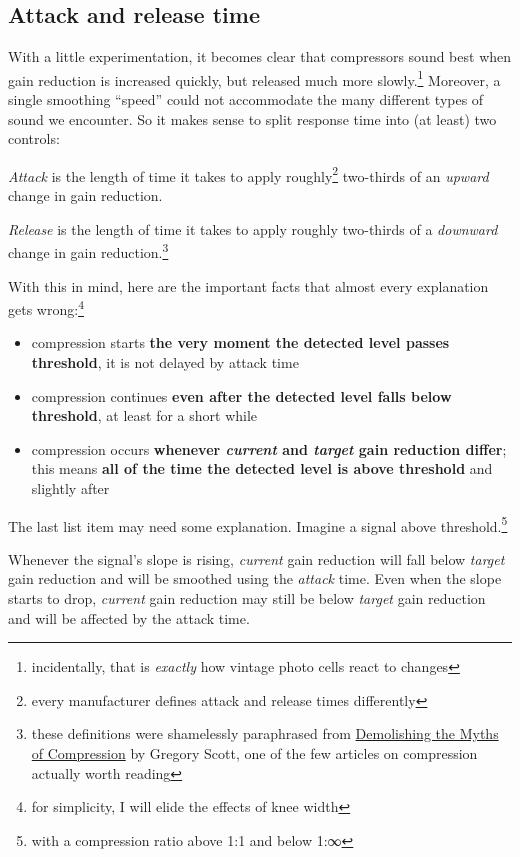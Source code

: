 \subsection{Attack and release time}
\label{sec:attack_and_release_time}

With a little experimentation, it becomes clear that compressors sound
best when gain reduction is increased quickly, but released much more
slowly.\footnote{incidentally, that is \emph{exactly} how vintage
  photo cells react to changes} Moreover, a single smoothing ``speed''
could not accommodate the many different types of sound we encounter.
So it makes sense to split response time into (at least) two controls:

\emph{Attack} is the length of time it takes to apply
roughly\footnote{every manufacturer defines attack and release times
  differently} two-thirds of an \emph{upward} change in gain
reduction.

\emph{Release} is the length of time it takes to apply roughly
two-thirds of a \emph{downward} change in gain
reduction.\footnote{these definitions were shamelessly paraphrased
  from
  \href{https://www.attackmagazine.com/features/columns/gregory-scott-demolishing-the-myths-of-compression/}{Demolishing
    the Myths of Compression} by Gregory Scott, one of the few
  articles on compression actually worth reading}

With this in mind, here are the important facts that almost every
explanation gets wrong:\footnote{for simplicity, I will elide the
  effects of knee width}

\begin{itemize}
\item compression starts \textbf{the very moment the detected level
    passes threshold}, it is not delayed by attack time
\item compression continues \textbf{even after the detected level
    falls below threshold}, at least for a short while
\item compression occurs \textbf{whenever \emph{current} and
    \emph{target} gain reduction differ}; this means \textbf{all of
    the time the detected level is above threshold} and slightly after
\end{itemize}

The last list item may need some explanation.  Imagine a signal above
threshold.\footnote{with a compression ratio above 1:1 and below 1:∞}

Whenever the signal's slope is rising, \emph{current} gain reduction
will fall below \emph{target} gain reduction and will be smoothed
using the \emph{attack} time.  Even when the slope starts to drop,
\emph{current} gain reduction may still be below \emph{target} gain
reduction and will be affected by the attack time.

